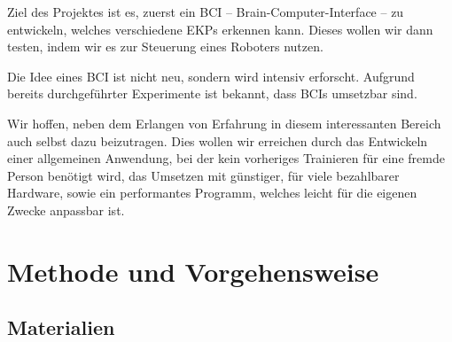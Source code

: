 \documentclass{scrartcl}
\begin{document}
	Ziel des Projektes ist es, zuerst ein BCI -- Brain-Computer-Interface -- zu entwickeln, welches verschiedene EKPs erkennen kann. Dieses wollen wir dann testen, indem wir es zur Steuerung eines Roboters nutzen.

	Die Idee eines BCI ist nicht neu, sondern wird intensiv erforscht. Aufgrund bereits durchgeführter Experimente ist bekannt, dass BCIs umsetzbar sind. \cite{BCIChaudhary}
	
	Wir hoffen, neben dem Erlangen von Erfahrung in diesem interessanten Bereich auch selbst dazu beizutragen. Dies wollen wir erreichen durch das Entwickeln einer allgemeinen Anwendung, bei der kein vorheriges Trainieren für eine fremde Person benötigt wird, das Umsetzen mit günstiger, für viele bezahlbarer Hardware, sowie ein performantes Programm, welches leicht für die eigenen Zwecke anpassbar ist.

	\newpage

	\section{Methode und Vorgehensweise}

	\subsection{Materialien} \label{Materialien}
\end{document}
